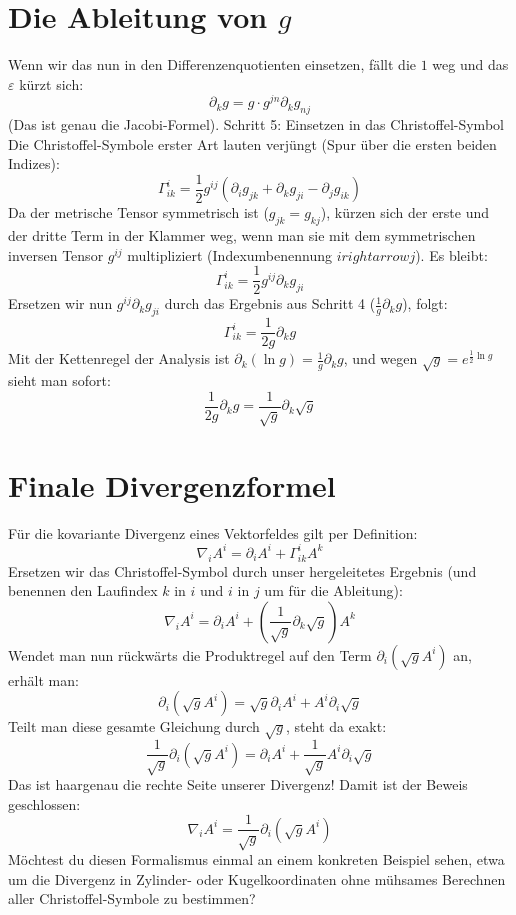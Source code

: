 \documentclass{article}
\newcommand{\p}[1]{\left(#1\right)}
\begin{document}
\section{Die Ableitung von $g$}

Wenn wir das nun in den Differenzenquotienten einsetzen, fällt die $1$ weg und das $ε$ kürzt sich:
$$\partial_k g = g · g^{jn} \partial_k g_{nj}$$ 
(Das ist genau die Jacobi-Formel).
Schritt 5: Einsetzen in das Christoffel-Symbol
Die Christoffel-Symbole erster Art lauten verjüngt (Spur über die ersten beiden Indizes):
$$\Gamma^i_{ik} = \frac{1}{2} g^{ij} \p{ \partial_i g_{jk} + \partial_k g_{ji} - \partial_j g_{ik} }$$ 
Da der metrische Tensor symmetrisch ist ($g_{jk} = g_{kj}$), kürzen sich der erste und der dritte Term in der Klammer weg, wenn man sie mit dem symmetrischen inversen Tensor $g^{ij}$ multipliziert (Indexumbenennung $i rightarrow j$). Es bleibt:
$$\Gamma^i_{ik} = \frac{1}{2} g^{ij} \partial_k g_{ji}$$ 
Ersetzen wir nun $g^{ij} \partial_k g_{ji}$ durch das Ergebnis aus Schritt 4 ($\frac{1}{g} \partial_k g$), folgt:
$$\Gamma^i_{ik} = \frac{1}{2g} \partial_k g$$ 
Mit der Kettenregel der Analysis ist $\partial_k (\ln g) = \frac{1}{g} \partial_k g$, und wegen $\sqrt{g} = e^{\frac{1}{2}\ln g}$ sieht man sofort:
$$\frac{1}{2g} \partial_k g = \frac{1}{\sqrt{g}} \partial_k \sqrt{g}$$ 

\section{Finale Divergenzformel}
Für die kovariante Divergenz eines Vektorfeldes gilt per Definition:
$$\nabla_i A^i = \partial_i A^i + \Gamma^i_{ik} A^k$$ 
Ersetzen wir das Christoffel-Symbol durch unser hergeleitetes Ergebnis (und benennen den Laufindex $k$ in $i$ und $i$ in $j$ um für die Ableitung):
$$\nabla_i A^i = \partial_i A^i + \p{\frac{1}{\sqrt{g}} \partial_k \sqrt{g}} A^k$$ 
Wendet man nun rückwärts die Produktregel auf den Term $\partial_i \p{ \sqrt{g} A^i }$ an, erhält man:
$$\partial_i \p{ \sqrt{g} A^i } = \sqrt{g} \partial_i A^i + A^i \partial_i \sqrt{g}$$ 
Teilt man diese gesamte Gleichung durch $\sqrt{g}$, steht da exakt:
$$\frac{1}{\sqrt{g}} \partial_i \p{ \sqrt{g} A^i } = \partial_i A^i + \frac{1}{\sqrt{g}} A^i \partial_i \sqrt{g}$$ 
Das ist haargenau die rechte Seite unserer Divergenz! Damit ist der Beweis geschlossen:
$$\nabla_i A^i = \frac{1}{\sqrt{g}} \partial_i \p{ \sqrt{g} A^i }$$ 
Möchtest du diesen Formalismus einmal an einem konkreten Beispiel sehen, etwa um die Divergenz in Zylinder- oder Kugelkoordinaten ohne mühsames Berechnen aller Christoffel-Symbole zu bestimmen?
\end{document}
